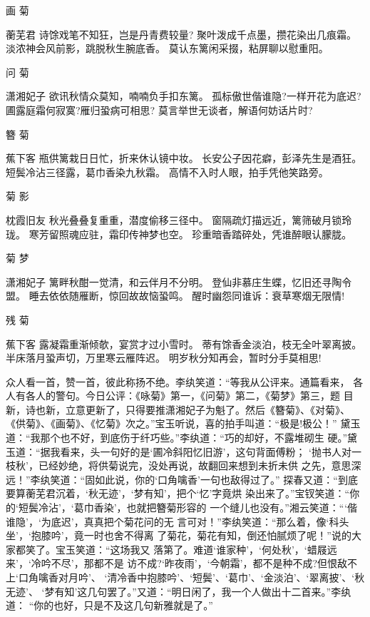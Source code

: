 画
菊

蘅芜君
诗馀戏笔不知狂，岂是丹青费较量?
聚叶泼成千点墨，攒花染出几痕霜。
淡浓神会风前影，跳脱秋生腕底香。
莫认东篱闲采掇，粘屏聊以慰重阳。

问
菊

潇湘妃子
欲讯秋情众莫知，喃喃负手扣东篱。
孤标傲世偕谁隐?一样开花为底迟?
圃露庭霜何寂寞?雁归蛩病可相思?
莫言举世无谈者，解语何妨话片时?

簪
菊

蕉下客
瓶供篱栽日日忙，折来休认镜中妆。
长安公子因花癖，彭泽先生是酒狂。
短鬓冷沾三径露，葛巾香染九秋霜。
高情不入时人眼，拍手凭他笑路旁。

菊
影

枕霞旧友
秋光叠叠复重重，潜度偷移三径中。
窗隔疏灯描远近，篱筛破月锁玲珑。
寒芳留照魂应驻，霜印传神梦也空。
珍重暗香踏碎处，凭谁醉眼认朦胧。

菊
梦

潇湘妃子
篱畔秋酣一觉清，和云伴月不分明。
登仙非慕庄生蝶，忆旧还寻陶令盟。
睡去依依随雁断，惊回故故恼蛩鸣。
醒时幽怨同谁诉：衰草寒烟无限情!

残
菊

蕉下客
露凝霜重渐倾欹，宴赏才过小雪时。
蒂有馀香金淡泊，枝无全叶翠离披。
半床落月蛩声切，万里寒云雁阵迟。
明岁秋分知再会，暂时分手莫相思!

众人看一首，赞一首，彼此称扬不绝。李纨笑道：“等我从公评来。通篇看来，
各人有各人的警句。今日公评：《咏菊》第一，《问菊》第二，《菊梦》第三，题
目新，诗也新，立意更新了，只得要推潇湘妃子为魁了。然后《簪菊》、《对菊》、
《供菊》、《画菊》、《忆菊》次之。”宝玉听说，喜的拍手叫道：“极是!极公！”
黛玉道：“我那个也不好，到底伤于纤巧些。”李纨道：“巧的却好，不露堆砌生
硬。”黛玉道：“据我看来，头一句好的是‘圃冷斜阳忆旧游’，这句背面傅粉；
‘抛书人对一枝秋’，已经妙绝，将供菊说完，没处再说，故翻回来想到未折未供
之先，意思深远！”李纨笑道：“固如此说，你的‘口角噙香’一句也敌得过了。”
探春又道：“到底要算蘅芜君沉着，‘秋无迹’，‘梦有知’，把个‘忆’字竟烘
染出来了。”宝钗笑道：“你的‘短鬓冷沾’，‘葛巾香染’，也就把簪菊形容的
一个缝儿也没有。”湘云笑道：“‘偕谁隐’，‘为底迟’，真真把个菊花问的无
言可对！”李纨笑道：“那么着，像‘科头坐’，‘抱膝吟’，竟一时也舍不得离
了菊花，菊花有知，倒还怕腻烦了呢！”说的大家都笑了。宝玉笑道：“这场我又
落第了。难道‘谁家种’，‘何处秋’，‘蜡屐远来’，‘冷吟不尽’，那都不是
访不成?‘昨夜雨’，‘今朝霜’，都不是种不成?但恨敌不上‘口角噙香对月吟’、
‘清冷香中抱膝吟’、‘短鬓’、‘葛巾’、‘金淡泊’、‘翠离披’、‘秋无迹’、
‘梦有知’这几句罢了。”又道：“明日闲了，我一个人做出十二首来。”李纨道：
“你的也好，只是不及这几句新雅就是了。”

